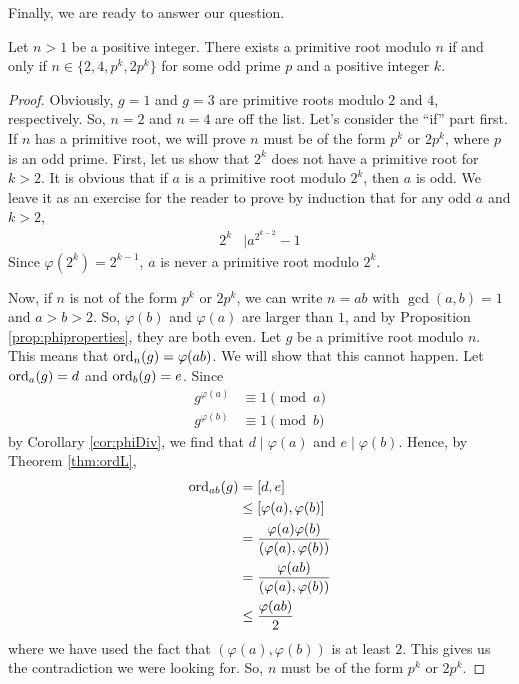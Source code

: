 \documentclass{subfile}
\begin{document}
Finally, we are ready to answer our question.

	\begin{theorem}
		Let $n>1$ be a positive integer. There exists a primitive root modulo $n$ if and only if $n\in\{2,4,p^k,2p^k\}$ for some odd prime $p$ and a positive integer $k$.
		\label{thm:pr:wh}
	\end{theorem}

	\begin{proof}
		Obviously, $g=1$ and $g=3$ are primitive roots modulo $2$ and $4$, respectively. So, $n=2$ and $n=4$ are off the list. Let's consider the ``if'' part first. If $n$ has a primitive root, we will prove $n$ must be of the form $p^k$ or $2p^k$, where $p$ is an odd prime.
		First, let us show that $2^k$ does not have a primitive root for $k >2$. It is obvious that if $a$ is a primitive root modulo $2^k$, then $a$ is odd. We leave it as an exercise for the reader to prove by induction that for any odd $a$ and $k>2$,
			\begin{align*}
				2^k & \mid a^{2^{k-2}}-1
			\end{align*}
		Since $\varphi(2^k)=2^{k-1}$, $a$ is never a primitive root modulo $2^k$.

		Now, if $n$ is not of the form $p^k$ or $2p^k$, we can write $n=ab$ with $\gcd(a,b)=1$ and $a>b>2$. So, $\varphi(b)$ and $\varphi(a)$ are larger than $1$, and by Proposition \ref{prop:phiproperties}, they are both even. Let $g$ be a primitive root modulo $n$. This means that $\operatorname{ord}_{n}(g)=\varphi(ab)$. We will show that this cannot happen. Let $\operatorname{ord}_a(g)=d$ and $\operatorname{ord}_b(g)=e$. Since
			\begin{align*}
				g^{\varphi(a)} & \equiv1\pmod a\\
				g^{\varphi(b)} & \equiv1\pmod b
			\end{align*}
		by Corollary \eqref{cor:phiDiv}, we find that $d \mid \varphi(a)$ and $e\mid \varphi(b)$.
		Hence, by Theorem \eqref{thm:ordL},
			\begin{align*}
				\operatorname{ord}_{ab}(g)
					& =  [d,e]\\
					& \leq [\varphi(a),\varphi(b)]\\
					& = \dfrac{\varphi(a) \varphi(b)}{(\varphi(a), \varphi(b))}\\
					& = \dfrac{\varphi(ab)}{(\varphi(a), \varphi(b))}\\
					& \leq  \dfrac{\varphi(ab)}{2}
			\end{align*}
		where we have used the fact that $(\varphi(a),\varphi(b))$ is at least $2$. This gives us the contradiction we were looking for. So, $n$ must be of the form $p^k$ or $2p^k$.


\end{proof}
\end{document}
